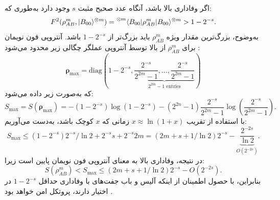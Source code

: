 اگر وفاداری بالا باشد، آنگاه عدد صحیح مثبت $s$ وجود دارد به‌طوری که:
\begin{equation*}
	F^2(\rho_{AB}^m, |B_{00}\rangle^{\otimes m}) = \prescript{\otimes m}{}{\langle} B_{00} | \rho_{AB}^m | B_{00} \rangle^{\otimes m} > 1 - 2^{-s}.
\end{equation*}
به‌وضوح، بزرگ‌ترین مقدار ویژه $\rho_{AB}^m$ باید بزرگ‌تر از $1 - 2^{-s}$ باشد. آنتروپی فون نویمان برای $\rho_{AB}^m$ از بالا توسط آنتروپی عملگر چگالی زیر محدود می‌شود \cite{7-6}:
\begin{equation}
	\bm{\rho}_{\max} = \text{diag} \left( 1 - 2^{-s}, \underbrace{\frac{2^{-s}}{2^{2m}-1}, \dots, \frac{2^{-s}}{2^{2m}-1}}_{2^{2m}-1 \text{ entries}} \right)
	\label{eq:7-53}
\end{equation}
که به‌صورت زیر داده می‌شود:
\begin{equation}
	S_{\max} = S(\bm{\rho}_{\max}) = -(1 - 2^{-s}) \log(1 - 2^{-s}) - (2^{2n} - 1) \frac{2^{-s}}{2^{2m}-1} \log \left( \frac{2^{-s}}{2^{2m}-1} \right).
	\label{eq:7-54}
\end{equation}
با استفاده از تقریب $x \approx \ln(1+x)$ زمانی که $x$ کوچک باشد، به‌دست می‌آوریم:
\begin{equation}
	S_{\max} \leq (1 - 2^{-s}) 2^{-s} / \ln 2 + 2^{-s}s + 2^{-s}2m = (2m + s + 1/\ln 2) 2^{-s} - \underbrace{\frac{2^{-2s}}{\ln 2}}_{O(2^{-2s})}.
	\label{eq:7-55}
\end{equation}
در نتیجه، وفاداری بالا به معنای آنتروپی فون نویمان پایین است زیرا:
\begin{equation}
	S(\rho_{AB}^m) < S_{\max} \leq (2m + s + 1/\ln 2) 2^{-s} - O(2^{-2s}).
	\label{eq:7-56}
\end{equation}
بنابراین، با حصول اطمینان از اینکه آلیس و باب جفت‌های  با وفاداری حداقل $1 - 2^{-s}$ در اختیار دارند، پروتکل  امن خواهد بود \cite{7-6}.




